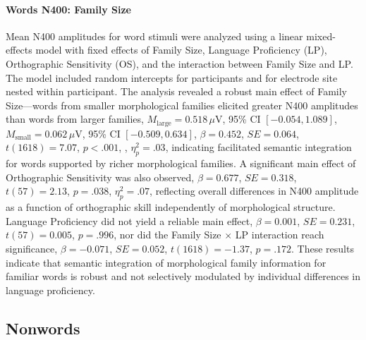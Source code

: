 \documentclass[utf8]{FrontiersinHarvard} %
\begin{document}
	\paragraph*{Words N400: Family Size}
	Mean N400 amplitudes for word stimuli were analyzed using a linear mixed-effects model with fixed effects of Family Size, Language Proficiency (LP), Orthographic Sensitivity (OS), and the interaction between Family Size and LP. The model included random intercepts for participants and for electrode site nested within participant. The analysis revealed a robust main effect of Family Size—words from smaller morphological families elicited greater N400 amplitudes than words from larger families, $M_{\mathrm{large}} = 0.518\,\mu$V, 95\% CI $[-0.054, 1.089]$, $M_{\mathrm{small}} = 0.062\,\mu$V, 95\% CI $[-0.509, 0.634]$, $\beta = 0.452$, $SE = 0.064$, $t(1618) = 7.07$, $p < .001$, , $\eta^2_p = .03$, indicating facilitated semantic integration for words supported by richer morphological families. A significant main effect of Orthographic Sensitivity was also observed, $\beta = 0.677$, $SE = 0.318$, $t(57) = 2.13$, $p = .038$, $\eta^2_p = .07$, reflecting overall differences in N400 amplitude as a function of orthographic skill independently of morphological structure. Language Proficiency did not yield a reliable main effect, $\beta = 0.001$, $SE = 0.231$, $t(57) = 0.005$, $p = .996$, nor did the Family Size $\times$ LP interaction reach significance, $\beta = -0.071$, $SE = 0.052$, $t(1618) = -1.37$, $p = .172$. These results indicate that semantic integration of morphological family information for familiar words is robust and not selectively modulated by individual differences in language proficiency.
	
	
	\subsection{Nonwords}
	
\end{document}
